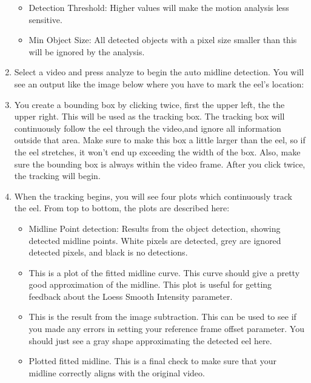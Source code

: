\documentclass[11pt]{report}
\begin{document}
\begin{enumerate}
\begin{itemize}
	      	\item Detection Threshold: Higher values will make the motion analysis less sensitive.

	      	\item Min Object Size: All detected objects with a pixel size smaller than this will be ignored by the analysis.

	      \end{itemize}

	\item Select a video and press analyze to begin the auto midline detection.
	      You will see an output like the image below where you have to mark the eel's location:


	\item You create a bounding box by clicking twice, first the upper left, the the upper right.
	      This will be used as the tracking box.
	      The tracking box will continuously follow the eel through the video,and ignore all information outside that area.
	      Make sure to make this box a little larger than the eel, so if the eel stretches, it won't end up exceeding the width of the box.
	      Also, make sure the bounding box is always within the video frame.
	      After you click twice, the tracking will begin.


	\item When the tracking begins, you will see four plots which continuously track the eel.
	      From top to bottom, the plots are described here:
	      \begin{itemize}
	      	\item Midline Point detection:  Results from the object detection, showing detected midline points.  White pixels are detected, grey are ignored detected pixels, and black is no detections.
	      	\item This is a plot of the fitted midline curve.
	      	      This curve should give a pretty good approximation of the midline.
	      	      This plot is useful for getting feedback about the Loess Smooth Intensity parameter.
	      	\item This is the result from the image subtraction.
	      	      This can be used to see if you made any errors in setting your reference frame offset parameter.
	      	      You should just see a gray shape approximating the detected eel here.
	      	\item Plotted fitted midline.
	      	      This is a final check to make sure that your midline correctly aligns with the original video.
	      \end{itemize}


\end{enumerate}
\end{document}
